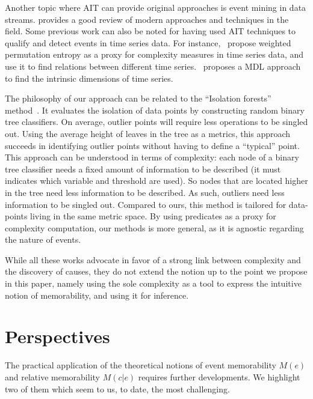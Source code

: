 \documentclass[entropy,article,submit,moreauthors,pdftex]{Definitions/mdpi}
\begin{document}
Another topic where AIT can provide original approaches is event mining in data streams.
\cite{aggarwal_outlier_2017} provides a good review of modern approaches and techniques
in the field. Some previous work can also be noted for having used AIT techniques to qualify and detect events in time series data. For instance,~\cite{batista_complexity-invariant_2011,fadlallah_weighted-permutation_2013} propose weighted permutation entropy as a proxy for complexity measures in time series data, and use it to find relations between different time series.~\cite{hu_discovering_2011} proposes a MDL approach to find the intrinsic dimensions of time series.

The philosophy of our approach can be related to the ``Isolation forests'' method~\cite{liu_isolation_2008,hariri_extended_2021}. It evaluates the isolation of data points by constructing random binary tree classifiers. On average, outlier points will require less operations to be singled out. Using the average height of leaves in the tree as a metrics, this approach succeeds in identifying outlier points without having to define a ``typical'' point. This approach can be understood in terms of complexity: each node of a binary tree classifier needs a fixed amount of information to be described (it must indicates which variable and threshold are used). So nodes that are located higher in the tree need less information to be described. As such, outliers need less information to be singled out. Compared to ours, this method is tailored for data-points living in the same metric space. By using predicates as a proxy for complexity computation, our methods is more general, as it is agnostic regarding the nature of events.

While all these works advocate in favor of a strong link between complexity and the
discovery of causes, they do not extend the notion up to the point we propose in this paper, namely using the sole complexity as a tool to express the intuitive notion of memorability, and using it for inference.

\section{Perspectives}
\label{sec:future}

The practical application of the theoretical notions of event memorability $M(e)$ and relative memorability $M(c|e)$ requires further developments. We highlight two of them which seem to us, to date, the most challenging.
\end{document}
